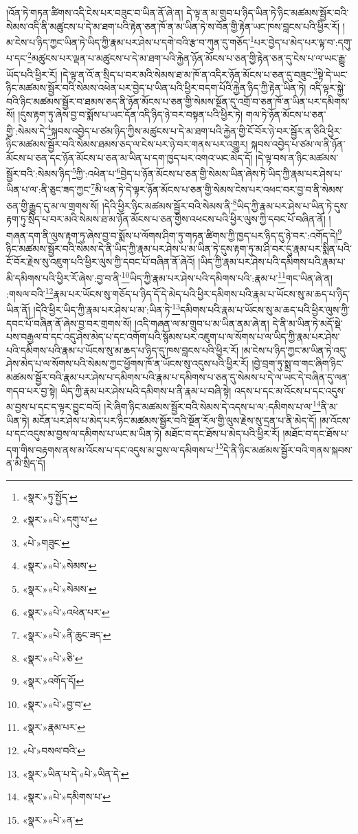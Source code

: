 །འོན་ཏེ་གཏན་ཚིགས་འདི་ངེས་པར་བཟུང་བ་ཡིན་ནོ་ཞེ་ན། དེ་ལྟ་ན་མ་གྲུབ་པ་ཉིད་ཡིན་ཏེ་ཉིང་མཚམས་སྦྱོར་བའི་སེམས་འདི་ནི་མཚུངས་པ་དེ་མ་ཐག་པའི་རྟེན་ཅན་ཁོ་ན་མ་ཡིན་ཏེ་ས་བོན་གྱི་རྟེན་ཡང་ཁས་བླངས་པའི་ཕྱིར་རོ། །མ་ངེས་པ་ཉིད་ཀྱང་ཡིན་ཏེ་ཡིད་ཀྱི་རྣམ་པར་ཤེས་པ་དགེ་བའི་རྩ་བ་ཀུན་དུ་གཅོད་\footnote{«སྣར་»ཏུ་སྤྱོད་}པར་བྱེད་པ་མེད་པར་ལྟ་བ་:དགུ་པ་དང་\footnote{«སྣར་»«པེ་»དགུ་པ་}མཚུངས་པར་ལྡན་པ་མཚུངས་པ་དེ་མ་ཐག་པའི་རྐྱེན་ཉོན་མོངས་པ་ཅན་གྱི་རྟེན་ཅན་དུ་ངེས་པ་ལ་ཡང་རྒྱུ་ཡོད་པའི་ཕྱིར་རོ། །དེ་ལྟ་ན་འོ་ན་སྲིད་པ་བར་མའི་སེམས་ཐ་མ་ཁོ་ན་འདིར་ཉོན་མོངས་པ་ཅན་དུ་བཟུང་\footnote{«པེ་»གཟུང་}སྟེ་དེ་ཡང་ཉིང་མཚམས་སྦྱོར་བའི་སེམས་འཕེན་པར་བྱེད་པ་ཡིན་པའི་ཕྱིར་བདག་པོའི་རྐྱེན་ཉིད་ཀྱི་རྟེན་ཡིན་ཏེ། འདི་ལྟར་སྐྱེ་བའི་ཉིང་མཚམས་སྦྱོར་བ་ཐམས་ཅད་ནི་ཉོན་མོངས་པ་ཅན་གྱི་སེམས་སྔོན་དུ་འགྲོ་བ་ཅན་ཁོ་ན་ཡིན་པར་དམིགས་སོ། །དུས་རྟག་ཏུ་ཞེས་བྱ་བ་སྨོས་པ་ཡང་དོན་འདི་ཉིད་ཉེ་བར་བསྟན་པའི་ཕྱིར་ཏེ། གལ་ཏེ་ཉོན་མོངས་པ་ཅན་གྱི་:སེམས་དེ་\footnote{«སྣར་»«པེ་»སེམས་}སྐབས་འབྱེད་པ་ཙམ་ཉིད་ཀྱིས་མཚུངས་པ་དེ་མ་ཐག་པའི་རྐྱེན་གྱི་ངོ་བོར་ཉེ་བར་སྦྱོར་ན་ཅིའི་ཕྱིར་ཉིང་མཚམས་སྦྱོར་བའི་སེམས་ཐམས་ཅད་ལ་ངེས་པར་ཉེ་བར་གནས་པར་འགྱུར། སྐབས་འབྱེད་པ་ཙམ་ལ་ནི་ཉོན་མོངས་པ་ཅན་དང་ཉོན་མོངས་པ་ཅན་མ་ཡིན་པ་དག་ཁྱད་པར་འགའ་ཡང་མེད་དོ། །དེ་ལྟ་བས་ན་ཉིང་མཚམས་སྦྱོར་བའི་:སེམས་ཉིད་\footnote{«སྣར་»«པེ་»སེམས་}ཀྱི་:འཕེན་པ་\footnote{«སྣར་»«པེ་»འཕེན་པར་}བྱེད་པ་ཉོན་མོངས་པ་ཅན་གྱི་སེམས་ཡིན་ཞེས་ཏེ་ཡིད་ཀྱི་རྣམ་པར་ཤེས་པ་ཡིན་པ་ལ་:ནི་ཅུང་ཟད་ཀྱང་\footnote{«སྣར་»«པེ་»ནི་ཆུང་ཟད་}མི་ཕན་ཏེ་དེ་ལྟར་ཉོན་མོངས་པ་ཅན་གྱི་སེམས་ངེས་པར་འཕང་བར་བྱ་བ་ནི་སེམས་ཅན་གྱི་རྒྱུད་དུ་མ་ལ་གྲགས་སོ། །དེའི་ཕྱིར་ཉིང་མཚམས་སྦྱོར་བའི་སེམས་ནི་\footnote{«སྣར་»«པེ་»ཅི་}ཡིད་ཀྱི་རྣམ་པར་ཤེས་པ་ཡིན་ཏེ་དུས་རྟག་ཏུ་སྲིད་པ་བར་མའི་སེམས་ཐ་མ་ཉོན་མོངས་པ་ཅན་གྱིས་འཕངས་པའི་ཕྱིར་ལུས་ཀྱི་དབང་པོ་བཞིན་ནོ། །གཞན་དག་ནི་ལུས་རྟག་ཏུ་ཞེས་བྱ་བ་སྨོས་པ་ལོགས་ཤིག་ཏུ་གཏན་ཚིགས་ཀྱི་ཁྱད་པར་ཉིད་དུ་ཉེ་བར་:འགོད་དེ།\footnote{«སྣར་»འགོད་དོ།} ཉིང་མཚམས་སྦྱོར་བའི་སེམས་དེ་ནི་ཡིད་ཀྱི་རྣམ་པར་ཤེས་པ་མ་ཡིན་ཏེ་དུས་རྟག་ཏུ་མ་ཤི་བར་དུ་རྣམ་པར་སྨིན་པའི་ངོ་བོར་རྗེས་སུ་འཇུག་པའི་ཕྱིར་ལུས་ཀྱི་དབང་པོ་བཞིན་ནོ་ཞེའོ། །ཡིད་ཀྱི་རྣམ་པར་ཤེས་པའི་དམིགས་པའི་རྣམ་པ་མི་དམིགས་པའི་ཕྱིར་རོ་ཞེས་:བྱ་བ་ནི་\footnote{«སྣར་»«པེ་»བྱ་བ་}ཡིད་ཀྱི་རྣམ་པར་ཤེས་པའི་དམིགས་པའི་:རྣམ་པ་\footnote{«སྣར་»རྣམ་པར་}གང་ཡིན་ཞེ་ན། :གསལ་བའི་\footnote{«པེ་»བསལ་བའི་}རྣམ་པར་ཡོངས་སུ་གཅོད་པ་ཉིད་དོ་དེ་མེད་པའི་ཕྱིར་དམིགས་པའི་རྣམ་པ་ཡོངས་སུ་མ་ཆད་པ་ཉིད་ཡིན་ནོ། །དེའི་ཕྱིར་ཡིད་ཀྱི་རྣམ་པར་ཤེས་པ་མ་:ཡིན་ཏེ་\footnote{«སྣར་»ཡིན་པ་དེ་«པེ་»ཡིན་དེ་}དམིགས་པའི་རྣམ་པ་ཡོངས་སུ་མ་ཆད་པའི་ཕྱིར་ལུས་ཀྱི་དབང་པོ་བཞིན་ནོ་ཞེས་བྱ་བར་གྲགས་སོ། །འདི་གཞན་ལ་མ་གྲུབ་པ་མ་ཡིན་ནམ་ཞེ་ན། དེ་ནི་མ་ཡིན་ཏེ་མདོ་སྡེ་པས་བརྒྱལ་བ་དང་འདུ་ཤེས་མེད་པ་དང་འགོག་པའི་སྙོམས་པར་འཇུག་པ་ལ་སོགས་པ་ལ་ཡིད་ཀྱི་རྣམ་པར་ཤེས་པའི་དམིགས་པའི་རྣམ་པ་ཡོངས་སུ་མ་ཆད་པ་ཉིད་དུ་ཁས་བླངས་པའི་ཕྱིར་རོ། །མ་ངེས་པ་ཉིད་ཀྱང་མ་ཡིན་ཏེ་འདུ་ཤེས་མེད་པ་ལ་སོགས་པའི་སེམས་ཀྱང་ཕྱོགས་ཁོ་ན་ཡོངས་སུ་འདུས་པའི་ཕྱིར་རོ། །བྱེ་བྲག་ཏུ་སྨྲ་བ་གང་ཞིག་ཉིང་མཚམས་སྦྱོར་བའི་རྣམ་པར་ཤེས་པ་དམིགས་པའི་རྣམ་པ་དམིགས་པ་ཅན་དུ་སེམས་པ་དེ་ལ་ཡང་དེ་བཞིན་དུ་ལན་གདབ་པར་བྱ་སྟེ། ཡིད་ཀྱི་རྣམ་པར་ཤེས་པའི་དམིགས་པ་ནི་རྣམ་པ་བཞི་སྟེ། འདས་པ་དང་མ་འོངས་པ་དང་འདུས་མ་བྱས་པ་དང་ད་ལྟར་བྱུང་བའོ། །རེ་ཞིག་ཉིང་མཚམས་སྦྱོར་བའི་སེམས་དེ་འདས་པ་ལ་:དམིགས་པ་ལ་\footnote{«སྣར་»«པེ་»དམིགས་པ་}ནི་མ་ཡིན་ཏེ། མངོན་པར་ཤེས་པ་མེད་པར་ཉིང་མཚམས་སྦྱོར་བའི་སྔོན་རོལ་གྱི་ལུས་རྗེས་སུ་དྲན་པ་ནི་མེད་དོ། །མ་འོངས་པ་དང་འདུས་མ་བྱས་ལ་དམིགས་པ་ཡང་མ་ཡིན་ཏེ། མཐོང་བ་དང་ཐོས་པ་མེད་པའི་ཕྱིར་རོ། །མཐོང་བ་དང་ཐོས་པ་དག་གིས་བརྟགས་ནས་མ་འོངས་པ་དང་འདུས་མ་བྱས་ལ་དམིགས་པ་\footnote{«སྣར་»«པེ་»ན་}དེ་ནི་ཉིང་མཚམས་སྦྱོར་བའི་གནས་སྐབས་ན་མི་སྲིད་དོ། 